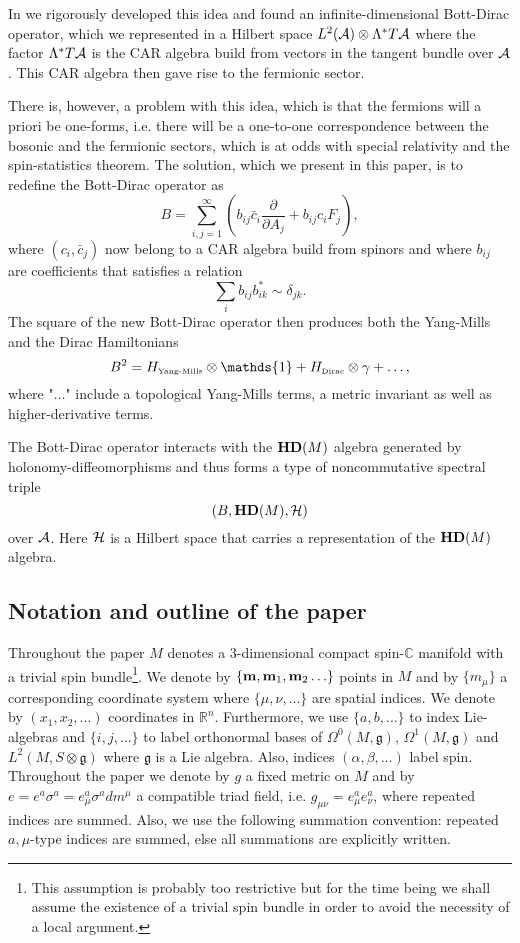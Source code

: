\documentclass[12pt]{article}
\def\a{\alpha}
\def\b{\beta}
\def\d{\delta}
\def\m{\mu}
\def\n{\nu}
\def\OO{\Omega}
\def\ca{{\cal A}}
\def\ch{{\cal H}}
\newcommand{\pa}{\partial}
\begin{document}
In \cite{Aastrup:2019yui} we rigorously developed this idea and found an infinite-dimensional Bott-Dirac operator, which we represented in a Hilbert space $L^2(\ca)\otimes \Lambda^* T\ca$ where the factor $\Lambda^* T\ca$ is the CAR algebra build from vectors in the tangent bundle over $\ca$. This CAR algebra then gave rise to the fermionic sector.

There is, however, a problem with this idea, which is that the fermions will a priori be one-forms, i.e. there will be a one-to-one correspondence between the bosonic and the fermionic sectors, which is at odds with special relativity and the spin-statistics theorem. 
The solution, which we present in this paper, is to redefine the Bott-Dirac operator as
$$
B= \sum_{i,j=1}^\infty \left( b_{ij}\bar{c}_i \frac{\pa}{\pa A_j} + b_{ij}{c}_i F_j\right),
$$
where $(c_i,\bar{c}_j)$ now belong to a CAR algebra build from spinors and where $b_{ij}$ are coefficients that satisfies a relation
$$
\sum_i b_{ij} b_{ik}^* \sim \d_{jk}.
$$
The square of the new Bott-Dirac operator then produces both the Yang-Mills and the Dirac Hamiltonians
$$
B^2= H_{\mbox{\tiny Yang-Mills}}\otimes \mathds{1} + H_{\mbox{\tiny Dirac}} \otimes \gamma + \ldots,
$$
where "$\ldots$" include a topological Yang-Mills terms, a metric invariant as well as higher-derivative terms.

The Bott-Dirac operator interacts with the ${\bf HD}(M)$ algebra generated by holonomy-diffeomorphisms and thus forms a type of noncommutative spectral triple
$$
(B, {\bf HD}(M), \ch )
$$
over $\ca$. Here $\ch$ is a Hilbert space that carries a representation of the ${\bf HD}(M)$ algebra. 



\subsection{Notation and outline of the paper}



Throughout the paper $M$ denotes a 3-dimensional compact spin-$\mathbb{C}$ manifold with a trivial spin bundle\footnote{This assumption is probably too restrictive but for the time being we shall assume the existence of a trivial spin bundle in order to avoid the necessity of a local argument.}. We denote by $\{{\bf m},{\bf m}_1,{\bf m}_2 \ldots\}$ points in $M$ and by $\{m_\m\}$ a corresponding coordinate system where $\{\m,\n, \ldots\}$ are spatial indices. We denote by $(x_1,x_2,\ldots)$ coordinates in $\mathbb{R}^n$. Furthermore, we use $\{a,b,\ldots\}$ to index Lie-algebras and $\{i,j,\ldots\}$ to label orthonormal bases of $\OO^0(M,\mathfrak{g})$, $\OO^1(M,\mathfrak{g})$ and $L^2(M,S\otimes \mathfrak{g})$ where $\mathfrak{g}$ is a Lie algebra. Also, indices $({\a,\b, \ldots})$ label spin.
Throughout the paper we denote by $g$ a fixed metric on $M$ and by $e= e^a\sigma^a= e_\m^a\sigma^a dm^\m $ a compatible triad field, i.e. $g_{\m\n}= e^a_\m e^a_\n$, where repeated indices are summed.  
Also, we use the following summation convention: repeated $a,\mu$-type indices are summed, else all summations are explicitly written.\\
\end{document}
